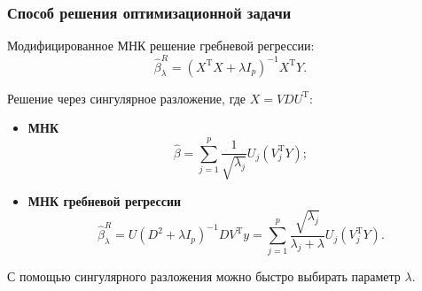\documentclass[unicode, notheorems]{beamer}
\newcommand{\T}{\mathrm{T}}
\begin{document}
\begin{frame}
\frametitle{Способ решения оптимизационной задачи}

Модифицированное МНК решение гребневой регрессии:
\[\hat{\beta}_{\lambda}^{R} = (X^{\mathrm{T}}X+ \lambda I_p)^{-1} X^{\mathrm{T}}Y.\]

Решение через сингулярное разложение, где $X = VDU^{\T}$:

\begin{itemize}
\item \textbf{МНК}
\[\hat{\beta} = \sum_{j=1}^p \frac{1}{\sqrt{\lambda_j}} U_j(V_j^{\T}Y);\]
\item \textbf{МНК гребневой регрессии }
\[\hat{\beta}_{\lambda}^{R} = U(D^2 + \lambda I_p)^{-1}DV^{\T}y = \sum_{j=1}^p \frac{\sqrt{\lambda_j}}{\lambda_j + \lambda} U_j(V_j^{\T}Y).\]

\end{itemize}

С помощью сингулярного разложения можно быстро выбирать параметр $\lambda$.




%
%
%
%
%

\end{frame}
\end{document}
